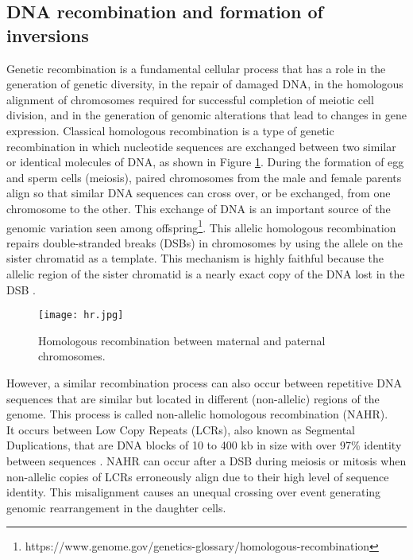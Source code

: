 \subsection{DNA recombination and formation of inversions}

Genetic recombination is a fundamental cellular process that has a role in the generation of genetic diversity, in the repair of damaged DNA, in the homologous alignment of chromosomes required for successful completion of meiotic cell division, and in the generation of genomic alterations that lead to changes in gene expression. Classical homologous recombination is a type of genetic recombination in which nucleotide sequences are exchanged between two similar or identical molecules of DNA, as shown in Figure \ref{fig:hr}. During the formation of egg and sperm cells (meiosis), paired chromosomes from the male and female parents align so that similar DNA sequences can cross over, or be exchanged, from one chromosome to the other. This exchange of DNA is an important source of the genomic variation seen among offspring\footnote{https://www.genome.gov/genetics-glossary/homologous-recombination}.
This allelic homologous recombination repairs double-stranded breaks (DSBs) in chromosomes by using the allele on the sister chromatid as a template. This mechanism is highly faithful because the allelic region of the sister chromatid is a nearly exact copy of the DNA lost in the DSB \cite{parks_detecting_2015}. 

\begin{figure}[h]

  \centering
    \texttt{[image: hr.jpg]}

  \caption{Homologous recombination between maternal and paternal chromosomes.}
  \label{fig:hr}
\end{figure}

However, a similar recombination process can also occur between repetitive DNA sequences that are similar but located in different (non-allelic) regions of the genome. This process is called non-allelic homologous recombination (NAHR). \\
It occurs between Low Copy Repeats (LCRs), also known as Segmental Duplications, that are DNA blocks of 10 to 400 kb in size with over
97\% identity between sequences \cite{burssed_mechanisms_2022}. NAHR can occur after a DSB during meiosis or mitosis when non-allelic copies of LCRs erroneously align due to their high level of sequence identity. This misalignment causes an unequal crossing over event generating genomic rearrangement in the daughter cells. 

